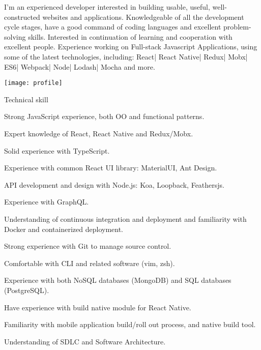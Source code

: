 \documentclass{resume}
\begin{document}

  \noindent\begin{minipage}{0.8\textwidth}%
    I'm an experienced developer interested in building usable, useful, well-constructed websites and applications. 
    Knowledgeable of all the development cycle stages, have a good command of coding languages and excellent problem-solving skills.
    Interested in continuation of learning and cooperation with excellent people.
    Experience working on Full-stack Javascript Applications, using some of the latest technologies, including:
    React| React Native| Redux| Mobx| ES6| Webpack| Node| Lodash| Mocha and more.
    \end{minipage}%
    \hfill%
    \begin{minipage}{0.1\textwidth}\raggedright
      \texttt{[image: profile]}
    \end{minipage}

  \begin{rSection}{Technical skill}
    \begin{rSubsection}{}{}{}{}
      \item Strong JavaScript experience, both OO and functional patterns.
      \item Expert knowledge of React, React Native and Redux/Mobx.
      \item Solid experience with TypeScript.
      \item Experience with common React UI library: MaterialUI, Ant Design.
      \item API development and design with Node.js: Koa, Loopback, Feathersjs.
      \item Experience with GraphQL.
      \item Understanding of continuous integration and deployment and familiarity with Docker and containerized deployment.
      \item Strong experience with Git to manage source control.
      \item Comfortable with CLI and related software (vim, zsh).
      \item Experience with both NoSQL databases (MongoDB) and SQL databases (PostgreSQL).
      \item Have experience with build native module for React Native.
      \item Familiarity with mobile application build/roll out process, and native build tool.
      \item Understanding of SDLC and Software Architecture.
    \end{rSubsection}
  \end{rSection}
  
\end{document}
